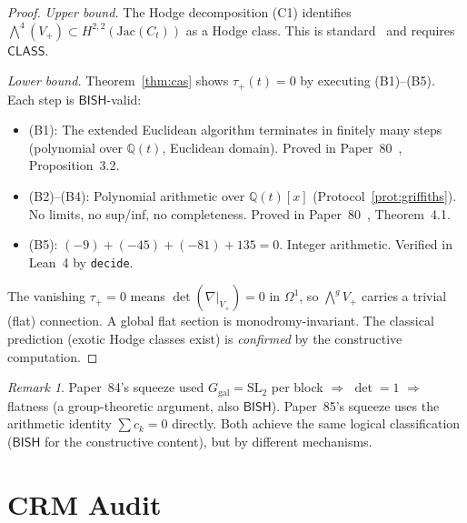 \documentclass[11pt]{article}
\theoremstyle{plain}
\theoremstyle{definition}
\theoremstyle{remark}
\newtheorem{remark}[theorem]{Remark}
\newcommand{\Q}{\mathbb{Q}}
\newcommand{\SL}{\mathrm{SL}}
\newcommand{\Ggal}{G_{\mathrm{gal}}}
\newcommand{\BISH}{\ensuremath{\mathsf{BISH}}}
\newcommand{\CLASS}{\ensuremath{\mathsf{CLASS}}}
\begin{document}
\begin{proof}
\emph{Upper bound.}
The Hodge decomposition (C1) identifies
$\bigwedge^4(V_+) \subset H^{2,2}(\mathrm{Jac}(C_t))$ as a
Hodge class.  This is standard~\cite{Voisin2024, EFS2025} and
requires $\CLASS$.

\emph{Lower bound.}
Theorem~\ref{thm:cas} shows $\tau_+(t) = 0$ by executing
(B1)--(B5).  Each step is $\BISH$-valid:
\begin{itemize}[nosep]
\item (B1): The extended Euclidean algorithm terminates in
  finitely many steps (polynomial over $\Q(t)$, Euclidean domain).
  Proved in Paper~80~\cite{Lee2026p80}, Proposition~3.2.
\item (B2)--(B4): Polynomial arithmetic over $\Q(t)[x]$
  (Protocol~\ref{prot:griffiths}).  No limits, no
  sup/inf, no completeness.  Proved in
  Paper~80~\cite{Lee2026p80}, Theorem~4.1.
\item (B5): $(-9) + (-45) + (-81) + 135 = 0$.  Integer arithmetic.
  Verified in Lean~4 by \texttt{decide}.
\end{itemize}
The vanishing $\tau_+ = 0$ means $\det(\nabla|_{V_+}) = 0$ in
$\Omega^1$, so $\bigwedge^g V_+$ carries a trivial (flat)
connection.  A global flat section is monodromy-invariant.
The classical prediction (exotic Hodge classes exist) is
\emph{confirmed} by the constructive computation.
\end{proof}

\begin{remark}\label{rem:squeeze-comparison}
Paper~84's squeeze used $\Ggal = \SL_2$ per block
$\Rightarrow$ $\det = 1$ $\Rightarrow$ flatness (a group-theoretic
argument, also $\BISH$).  Paper~85's squeeze uses the arithmetic
identity $\sum c_k = 0$ directly.  Both achieve the same logical
classification ($\BISH$ for the constructive content), but by
different mechanisms.
\end{remark}

\section{CRM Audit}\label{sec:audit}
\end{document}
